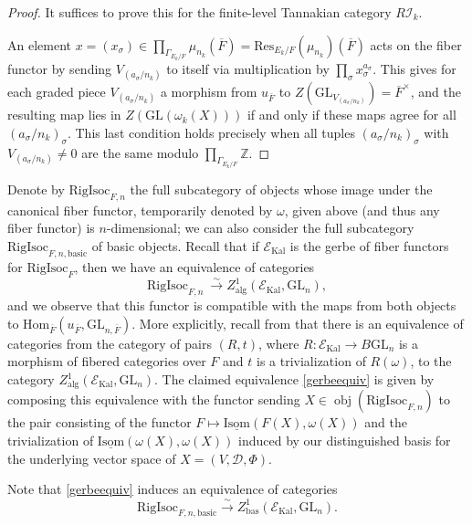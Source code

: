\documentclass[11pt]{amsart}
\theoremstyle{definition}
\newcommand{\mc}{\mathcal}
\newcommand{\Z}{\mathbb{Z}}
\newcommand{\ov}{\overline}
\newcommand{\RigIsoc}{\mathrm{RigIsoc}}
\newcommand{\GL}{\mathrm{GL}}
\DeclareMathOperator{\Kal}{Kal}
\DeclareMathOperator{\Ob}{obj}
\DeclareMathOperator{\bas}{bas}
\begin{document}
\begin{proof}
It suffices to prove this for the finite-level Tannakian category $R\mc{I}_{k}$.

An element $x = (x_{\sigma}) \in  \prod_{\Gamma_{E_{k}/F}} \mu_{n_{k}}(\ov{F}) = \mathrm{Res}_{E_{k}/F}(\mu_{n_{k}})(\ov{F})$ acts on the fiber functor by sending $V_{(a_{\sigma}/n_{k})}$ to itself via multiplication by $\prod_{\sigma}x_{\sigma}^{a_{\sigma}}$. This gives for each graded piece $V_{(a_{\sigma}/n_{k})}$ a morphism from $u_{\ov{F}}$ to $Z(\GL_{V_{(a_{\sigma}/n_{k})}}) = \ov{F}^{\times}$, and the resulting map lies in $Z(\GL(\omega_{k}(X)))$ if and only if these maps agree for all $(a_{\sigma}/n_{k})_{\sigma}$. This last condition holds precisely when all tuples $(a_{\sigma}/n_{k})_{\sigma}$ with $V_{(a_{\sigma}/n_{k})} \neq 0$ are the same modulo $\prod_{\Gamma_{E_{k}/F}}\Z$.
\end{proof}

Denote by $\RigIsoc_{F,n}$ the full subcategory of objects whose image under the canonical fiber functor, temporarily denoted by $\omega$, given above (and thus any fiber functor) is $n$-dimensional; we can also consider the full subcategory $\RigIsoc_{F,n,\text{basic}}$ of basic objects. Recall that if $\mathcal{E}_{\text{Kal}}$ is the gerbe of fiber functors for $\RigIsoc_{F}$, then we have an equivalence of categories
\begin{equation}\label{gerbeequiv}
  \RigIsoc_{F,n} \ \xrightarrow{\sim} Z_{\text{alg}}^{1}(\mathcal{E}_{\text{Kal}}, \mathrm{GL}_{n}),
\end{equation}
and we observe that this functor is compatible with the maps from both objects to $\text{Hom}_{\ov{F}}(u_{\ov{F}},\mathrm{GL}_{n,\ov{F}})$. More explicitly, recall from \cite[Proposition 7.1]{Taibi25} that there is an equivalence of categories from the category of pairs $(R,t)$, where $R \colon \mathcal{E}_{\Kal} \to B\mathrm{GL}_{n}$ is a morphism of fibered categories over $F$ and $t$ is a trivialization of $R(\omega)$, to the category $Z_{\text{alg}}^{1}(\mathcal{E}_{\text{Kal}}, \mathrm{GL}_{n})$. The claimed equivalence \eqref{gerbeequiv} is given by composing this equivalence with the functor sending $X \in \Ob(\RigIsoc_{F,n})$ to the pair consisting of the functor $F \mapsto \underline{\text{Isom}}(F(X), \omega(X))$ and the trivialization of $\underline{\text{Isom}}(\omega(X), \omega(X))$ induced by our distinguished basis for the underlying vector space of $X = (V,\mathcal{D}, \Phi)$.


Note that \eqref{gerbeequiv} induces an equivalence of categories 
\begin{equation*}
  \RigIsoc_{F,n,\text{basic}} \xrightarrow{\sim} Z_{\bas}^{1}(\mathcal{E}_{\text{Kal}}, \mathrm{GL}_{n}).
\end{equation*}
\end{document}
